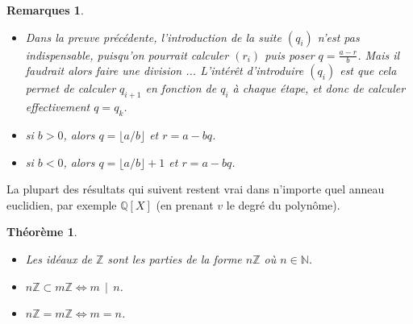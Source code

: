 \documentclass[10pt,a4paper]{report}
\newtheorem{thm}{Théorème}[chapter]
\newtheorem*{rems}{Remarques}
\begin{document}
\begin{rems}\
\begin{itemize}
\item[•] Dans la preuve  précédente, l'introduction de la suite $(q_i)$ n'est pas indispensable, puisqu'on pourrait calculer $(r_i)$ puis poser $q=\frac{a-r}{b}$. Mais il faudrait alors faire une division ... L'intérêt d'introduire $(q_i)$ est que cela permet de calculer $q_{i+1}$ en fonction de $q_i$ à chaque étape, et donc de calculer effectivement $q=q_k$.

\item[•] si $b>0$, alors $q=\lfloor {a}/{b} \rfloor$ et $r=a-bq$.
\item[•] si $b<0$, alors $q=\lfloor {a}/{b} \rfloor +1 $ et $r=a-bq$.
\end{itemize}
\end{rems}


La plupart des résultats qui suivent restent vrai dans n'importe quel anneau euclidien, par exemple $\mathbb{Q}[X]$ (en prenant $v$ le degré du polynôme).



\begin{thm}\label{thmZ_principal}\
\begin{itemize}
\item[$1)$] Les idéaux de $\mathbb{Z}$ sont les parties de la forme $n \mathbb{Z}$ où $n \in \mathbb{N}$.
\item[$2)$] $n \mathbb{Z} \subset m \mathbb{Z} \Leftrightarrow  m \, \mid \, n$.
\item[$3)$] $n \mathbb{Z} = m \mathbb{Z} \Leftrightarrow  m = n$.
\end{itemize}
\end{thm}
\end{document}
